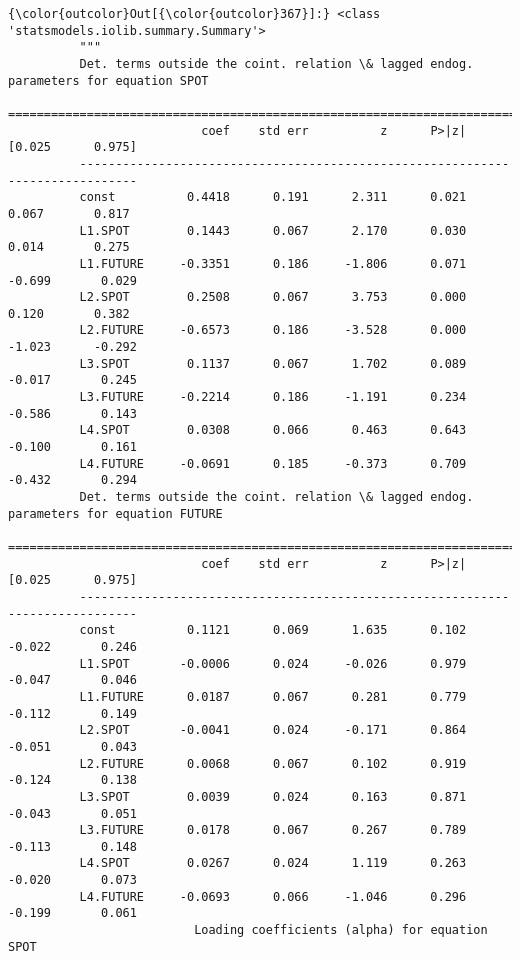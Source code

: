 \documentclass[11pt]{article}
\begin{document}
\begin{Verbatim}[commandchars=\\\{\}]
{\color{outcolor}Out[{\color{outcolor}367}]:} <class 'statsmodels.iolib.summary.Summary'>
          """
          Det. terms outside the coint. relation \& lagged endog. parameters for equation SPOT
          ==============================================================================
                           coef    std err          z      P>|z|      [0.025      0.975]
          ------------------------------------------------------------------------------
          const          0.4418      0.191      2.311      0.021       0.067       0.817
          L1.SPOT        0.1443      0.067      2.170      0.030       0.014       0.275
          L1.FUTURE     -0.3351      0.186     -1.806      0.071      -0.699       0.029
          L2.SPOT        0.2508      0.067      3.753      0.000       0.120       0.382
          L2.FUTURE     -0.6573      0.186     -3.528      0.000      -1.023      -0.292
          L3.SPOT        0.1137      0.067      1.702      0.089      -0.017       0.245
          L3.FUTURE     -0.2214      0.186     -1.191      0.234      -0.586       0.143
          L4.SPOT        0.0308      0.066      0.463      0.643      -0.100       0.161
          L4.FUTURE     -0.0691      0.185     -0.373      0.709      -0.432       0.294
          Det. terms outside the coint. relation \& lagged endog. parameters for equation FUTURE
          ==============================================================================
                           coef    std err          z      P>|z|      [0.025      0.975]
          ------------------------------------------------------------------------------
          const          0.1121      0.069      1.635      0.102      -0.022       0.246
          L1.SPOT       -0.0006      0.024     -0.026      0.979      -0.047       0.046
          L1.FUTURE      0.0187      0.067      0.281      0.779      -0.112       0.149
          L2.SPOT       -0.0041      0.024     -0.171      0.864      -0.051       0.043
          L2.FUTURE      0.0068      0.067      0.102      0.919      -0.124       0.138
          L3.SPOT        0.0039      0.024      0.163      0.871      -0.043       0.051
          L3.FUTURE      0.0178      0.067      0.267      0.789      -0.113       0.148
          L4.SPOT        0.0267      0.024      1.119      0.263      -0.020       0.073
          L4.FUTURE     -0.0693      0.066     -1.046      0.296      -0.199       0.061
                          Loading coefficients (alpha) for equation SPOT                

\end{Verbatim}
\end{document}
